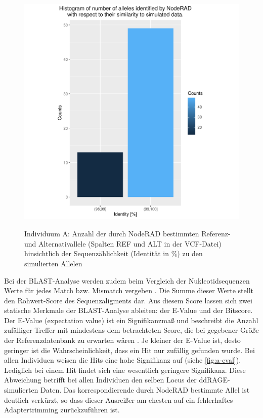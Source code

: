 \begin{figure}[H]
	\begin{center}
		\includegraphics[height=12cm]{bilder/evaluation/hist_perc_ident/A.plot_hist.pdf}
		\caption{Individuum A: Anzahl der durch NodeRAD bestimmten Referenz- und Alternativallele (Spalten REF und ALT in der VCF-Datei) hinsichtlich der Sequenzählichkeit (Identität in $ \% $) zu den simulierten Allelen}
		\label{fig:a-hist}
	\end{center}
\end{figure}


Bei der BLAST-Analyse werden zudem beim Vergleich der Nukleotidsequenzen Werte für jedes Match bzw. Mismatch vergeben \cite{gaedeke_2007}. Die Summe dieser Werte stellt den Rohwert-Score des Sequenzaligments dar. Aus diesem Score lassen sich zwei statische Merkmale der BLAST-Analyse ableiten: der E-Value und der Bitscore. \\

Der E-Value (expectation value) ist ein Signifikanzmaß und beschreibt die Anzahl zufälliger Treffer mit mindestens dem betrachteten Score, die bei gegebener Größe der Referenzdatenbank zu erwarten wären \cite{gaedeke_2007}. Je kleiner der E-Value ist, desto geringer ist die Wahrscheinlichkeit, dass ein Hit nur zufällig gefunden wurde. Bei allen Individuen weisen die Hits eine hohe Signifikanz auf (siehe \autoref{fig:a-eval}). Lediglich bei einem Hit findet sich eine wesentlich geringere Signifikanz. Diese Abweichung betrifft bei allen Individuen den selben Locus der ddRAGE-simulierten Daten. Das korrespondierende durch NodeRAD bestimmte Allel ist deutlich verkürzt, so dass dieser Ausreißer am ehesten auf ein fehlerhaftes Adaptertrimming zurückzuführen ist.\\

